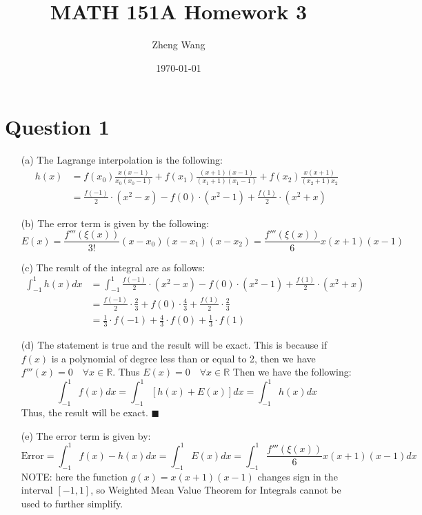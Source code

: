 \documentclass[11pt]{article}
\author{Zheng Wang}
\date{\today}
\title{MATH 151A Homework 3}
\begin{document}
\maketitle


\section*{Question 1}
\begin{itemize}
	\item [(a)]
	The Lagrange interpolation is the following:
	\begin{equation*}
	\begin{aligned}
	h(x) &= f(x_0)\frac{x(x-1)}{x_0(x_0-1)} + f(x_1)\frac{(x+1)(x-1)}{(x_1+1)(x_1-1)} + f(x_2)\frac{x(x+1)}{(x_2+1)x_2}\\
	&=\frac{f(-1)}{2}\cdot (x^2-x) - f(0)\cdot (x^2-1) + \frac{f(1)}{2}\cdot (x^2+x)
	\end{aligned}
	\end{equation*}
	
	\item [(b)]
	The error term is given by the following:
	\[ E(x) = \frac{f'''(\xi(x))}{3!}(x-x_0)(x-x_1)(x-x_2) = \frac{f'''(\xi(x))}{6}x(x+1)(x-1)  \]
	
	\item [(c)]
	The result of the integral are as follows:
	\begin{equation*}
	\begin{aligned}
	\int_{-1}^{1}h(x) dx &= \int_{-1}^{1} \frac{f(-1)}{2}\cdot (x^2-x) - f(0)\cdot (x^2-1) + \frac{f(1)}{2}\cdot (x^2+x)\\
	&= \frac{f(-1)}{2}\cdot\frac{2}{3} + f(0)\cdot\frac{4}{3} + \frac{f(1)}{2}\cdot\frac{2}{3}\\
	&=\frac{1}{3}\cdot f(-1) + \frac{4}{3}\cdot f(0) + \frac{1}{3}\cdot f(1)
	\end{aligned}
	\end{equation*}
	
	\item[(d)]
	The statement is true and the result will be exact. This is because if $ f(x) $ is a polynomial of degree less than or equal to 2, then we have $ f'''(x)=0\quad \forall x\in \mathbb{R} $. Thus $ E(x) = 0 \quad \forall x \in \mathbb{R} $
	Then we have the following:
	\[ \int_{-1}^{1} f(x) dx = \int_{-1}^{1} [h(x) + E(x)] dx = \int_{-1}^{1} h(x) dx \]
	Thus, the result will be exact. \hfill $ \blacksquare $
	
	\item [(e)]
	The error term is given by:
	\[ \text{Error} = \int_{-1}^{1} f(x)-h(x) dx = \int_{-1}^{1} E(x) dx = \int_{-1}^{1} \frac{f'''(\xi(x))}{6}x(x+1)(x-1) dx \]
	NOTE: here the function $ g(x) = x(x+1)(x-1) $ changes sign in the interval $ [-1,1] $, so Weighted Mean Value Theorem for Integrals cannot be used to further simplify.\pagebreak
\end{itemize}
\end{document}

